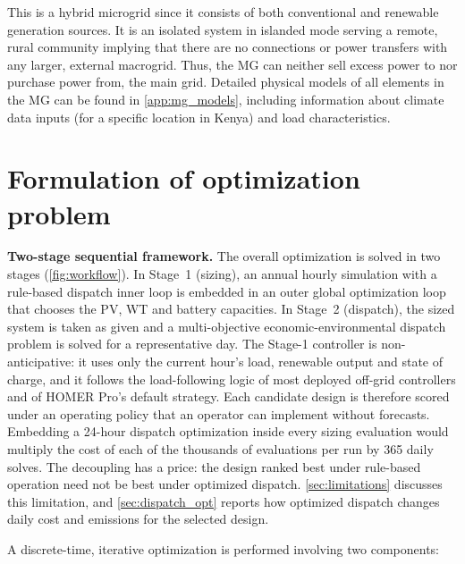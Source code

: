 \documentclass[final,3p,times]{elsarticle}
\begin{document}
This is a hybrid microgrid since it consists of both conventional and renewable generation sources. It is an isolated system in islanded mode serving a remote, rural community implying that there are no connections or power transfers with any larger, external macrogrid. Thus, the MG can neither sell excess power to nor purchase power from, the main grid. Detailed physical models of all elements in the MG can be found in \cref{app:mg_models}, including information about climate data inputs (for a specific location in Kenya) and load characteristics. 

\section{Formulation of optimization problem \label{sec:opt_prob}}

\textbf{Two-stage sequential framework.} The overall optimization is solved in two stages (\cref{fig:workflow}). In Stage~1 (sizing), an annual hourly simulation with a rule-based dispatch inner loop is embedded in an outer global optimization loop that chooses the PV, WT and battery capacities. In Stage~2 (dispatch), the sized system is taken as given and a multi-objective economic-environmental dispatch problem is solved for a representative day. The Stage-1 controller is non-anticipative: it uses only the current hour's load, renewable output and state of charge, and it follows the load-following logic of most deployed off-grid controllers and of HOMER Pro's default strategy. Each candidate design is therefore scored under an operating policy that an operator can implement without forecasts. Embedding a 24-hour dispatch optimization inside every sizing evaluation would multiply the cost of each of the thousands of evaluations per run by 365 daily solves. The decoupling has a price: the design ranked best under rule-based operation need not be best under optimized dispatch. \cref{sec:limitations} discusses this limitation, and \cref{sec:dispatch_opt} reports how optimized dispatch changes daily cost and emissions for the selected design.

A discrete-time, iterative optimization is performed involving two components:
\end{document}
